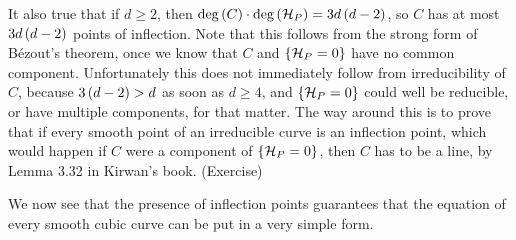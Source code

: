 \begin{remark}
\label{rem:13.6}
It also true that if $ d \ge 2 $, then $ \deg\br{C} \cdot \deg\br{\HH_P} = 3d\br{d - 2} $, so $ C $ has at most $ 3d\br{d - 2} $ points of inflection. Note that this follows from the strong form of B\'ezout's theorem, once we know that $ C $ and $ \cbr{\HH_P = 0} $ have no common component. Unfortunately this does not immediately follow from irreducibility of $ C $, because $ 3\br{d - 2} > d $ as soon as $ d \ge 4 $, and $ \cbr{\HH_P = 0} $ could well be reducible, or have multiple components, for that matter. The way around this is to prove that if every smooth point of an irreducible curve is an inflection point, which would happen if $ C $ were a component of $ \cbr{\HH_P = 0} $, then $ C $ has to be a line, by Lemma 3.32 in Kirwan's book. (Exercise)
\end{remark}

We now see that the presence of inflection points guarantees that the equation of every smooth cubic curve can be put in a very simple form.

